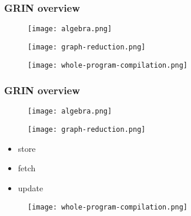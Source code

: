 \documentclass[bigger]{beamer}
\begin{document}
\begin{frame}[fragile]
\frametitle{GRIN overview}
\begin{center}

	\begin{minipage}{0.30\textwidth}
		\begin{figure}
			\texttt{[image: algebra.png]}
		\end{figure}
	\end{minipage}
	\hfill
	\begin{minipage}{0.30\textwidth}
		\begin{figure}
			\texttt{[image: graph-reduction.png]}
		\end{figure}
	\end{minipage}
	\hfill
	\begin{minipage}{0.30\textwidth}
		\begin{figure}
			\texttt{[image: whole-program-compilation.png]}
		\end{figure}
	\end{minipage}

\end{center}
\end{frame}

\begin{frame}[fragile]
\frametitle{GRIN overview}
\begin{center}

	\begin{minipage}{0.30\textwidth}
		\begin{figure}
			\texttt{[image: algebra.png]}
		\end{figure}
	\end{minipage}
	\hfill
	\begin{minipage}{0.30\textwidth}
		\vspace{1cm}
		\begin{figure}
			\texttt{[image: graph-reduction.png]}
		\end{figure}
		\vspace{-0.5cm}
		\begin{itemize}
			\item<1-> store
			\item<2-> fetch
			\item<3-> update
		\end{itemize}
	\end{minipage}
	\hfill
	\begin{minipage}{0.30\textwidth}
		\begin{figure}
			\texttt{[image: whole-program-compilation.png]}
		\end{figure}
	\end{minipage}

\end{center}
\end{frame}
\end{document}
